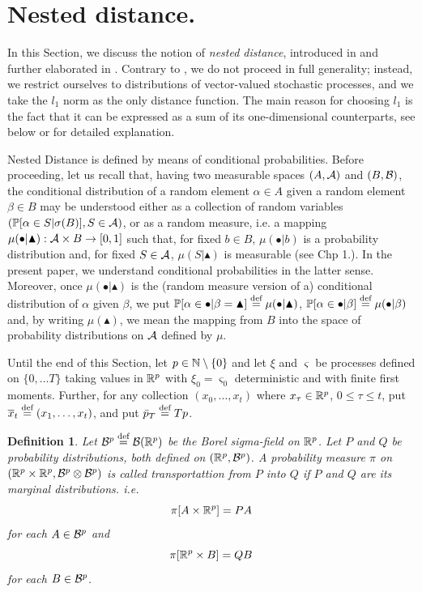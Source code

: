 \documentclass{article}              %
\newtheorem{definition}{Definition}
\begin{document}
\section{\label{sec:Nested}Nested distance.}

In this Section, we discuss the notion of {\em nested distance}, introduced
in \cite{pflug2012distance} and further elaborated in \cite{pflug2014multistage}.
Contrary to \cite{pflug2014multistage}, we do not proceed in full
generality; instead, we restrict ourselves to distributions of vector-valued
stochastic processes, and we take the $l_{1}$ norm as the only distance
function. The main reason for choosing $l_{1}$ is the fact that it can be expressed as a sum of its one-dimensional counterparts, see below or \cite{Smid09c} for detailed explanation.

Nested Distance is defined by means of conditional probabilities.
Before proceeding, let us recall that, having two measurable spaces $(A,\mathcal{A})$ and $(B,\mathcal{B})$, the conditional distribution of
a random element $\alpha\in A$ given a random element $\beta\in B$
may be understood either as a collection of random variables $(\mathbb{P}[\alpha\in S|\sigma(B)],S \in \mathcal{A})$, or as a random measure, i.e. a mapping $\mu(\bullet|\blacktriangle):\mathcal{A}\times B\rightarrow[0,1]$
such that, for fixed $b\in B$, $\mu(\bullet|b)$ is a probability
distribution and, for fixed $S\in\mathcal{A}$, $\mu(S|\blacktriangle)$ is
measurable (see \cite{Kallenberg02} Chp 1.). In the present paper,
we understand conditional probabilities in the latter sense. Moreover, once
$\mu(\bullet|\blacktriangle)$ is the (random measure version of a) conditional
distribution of $\alpha$ given $\beta$, we put $\mathbb{P}[\alpha\in\bullet|\beta=\blacktriangle]\stackrel{\text{\rm def}}{=}\mu(\bullet|\blacktriangle)$,
$\mathbb{P}[\alpha\in\bullet|\beta]\stackrel{\text{\rm def}}{=}\mu(\bullet|\beta)$ and, by writing
$\mu(\blacktriangle)$, we mean the mapping from $B$ into the
space of probability distributions on $\mathcal{A}$ defined by $\mu$.

Until the end of this Section, let $p\in\mathbb{N} \setminus \{0\}$ and let $\xi$ and $\varsigma$
be processes defined on $\{0,\dots T\}$ taking values in $\mathbb{R}^{p}$
with $\xi_{0}=\varsigma_{0}$ deterministic and with finite first
moments. Further, 
for any collection $(x_{0},\dots,x_{t})$ where $x_\tau \in \mathbb{R}^p$, $0\leq \tau \leq t$, put $\overline{x}_{t}\stackrel{\text{\rm def}}{=}(x_{1},\dots,x_{t})$, and put $\bar{p}_{T}\stackrel{\text{\rm def}}{=} Tp$.

\begin{definition} Let $\mathcal{B}^{p}\stackrel{\text{\rm def}}{=}\mathcal{B}(\mathbb{R}^{p})$ be the Borel
sigma-field on $\mathbb{R}^{p}$.
Let $P$ and $Q$ be probability distributions, both defined on $(\mathbb{R}^{p},\mathcal{B}^{p})$. A probability measure $\pi$ on $(\mathbb{R}^{p}\times\mathbb{R}^{p},\mathcal{B}^{p}\otimes\mathcal{B}^{p})$
is called \emph{transportattion} from $P$ into $Q$ if $P$ and
$Q$ are its marginal distributions. i.e.
\begin{equation}
\pi[A\times\mathbb{R}^{p}]=PA\label{eq:tpp}
\end{equation}
for each $A\in\mathcal{B}^{p}$ and 
\begin{equation}
\pi[\mathbb{R}^{p}\times B]=QB\label{eq:tpq}
\end{equation}
for each $B\in\mathcal{B}^{p}$. 
\end{definition}
\end{document}
